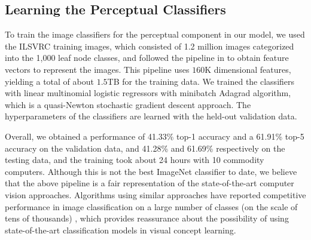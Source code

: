 
\subsection{Learning the Perceptual Classifiers}
To train the image classifiers for the perceptual component in our model, we used the ILSVRC training images, which consisted of 1.2 million images categorized into the 1,000 leaf node classes, and followed the pipeline in \cite{lin2011large} to obtain feature vectors to represent the images. This pipeline uses $160$K dimensional features, yielding a total of about $1.5$TB for the training data. 
We trained the classifiers with linear multinomial logistic regressors with minibatch Adagrad \cite{duchi2010adaptive} algorithm, which is a quasi-Newton stochastic gradient descent approach. The hyperparameters of the classifiers are learned with the held-out validation data.

Overall, we obtained a performance of 41.33\% top-1 accuracy and a 61.91\% top-5 accuracy on the validation data, and 41.28\% and 61.69\% respectively on the testing data, and the training took about 24 hours with 10 commodity computers. Although this is not the best ImageNet classifier to date, we believe that the above pipeline is a fair representation of the state-of-the-art computer vision approaches. Algorithms using similar approaches have reported competitive performance in image classification on a large number of classes (on the scale of tens of thousands) \cite{le2012icml, krizhevsky2012imagenet}, which provides reassurance about the possibility of using state-of-the-art classification models in visual concept learning.

